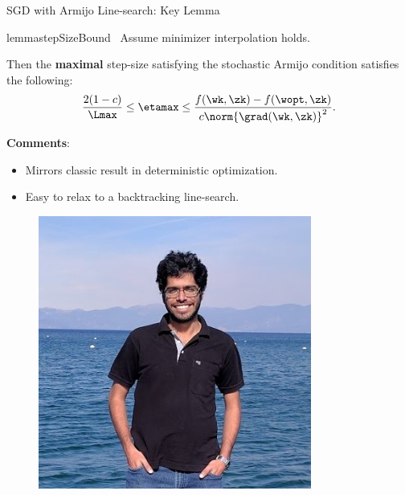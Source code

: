 \documentclass[mathserif,notheorems, hyperref={colorlinks, citecolor=blue, urlcolor=blue, linkcolor=blue}]{beamer}
\def\\{}%
\begin{document}
\begin{frame}{SGD with Armijo Line-search: Key Lemma}
	\vspace{-2ex}
	\begin{minipage}[t]{0.82\textwidth}
		\vspace{-1.45ex}
		\begin{restatable}{lemma}{stepSizeBound}~\label{lemma:step-size-bound}
			Assume minimizer interpolation holds.\\

			Then the \textbf{maximal} step-size satisfying the stochastic Armijo condition satisfies the following:
			\[ \frac{2 (1-c)}{\Lmax} \leq \etamax \leq \frac{f(\wk, \zk) - f(\wopt, \zk)}{c \norm{\grad(\wk, \zk)}^2}. \]
		\end{restatable}

		\textbf{Comments}:
		\begin{itemize}
			\item Mirrors classic result in deterministic optimization.
			\item Easy to relax to a backtracking line-search.
		\end{itemize}

	\end{minipage}
	\begin{minipage}[t]{0.15\textwidth}
		\begin{figure}[t]
			\centering
			\includegraphics[width=0.8\textwidth]{collaborators/sharan}


\end{figure}
\end{minipage}
\end{frame}
\end{document}
